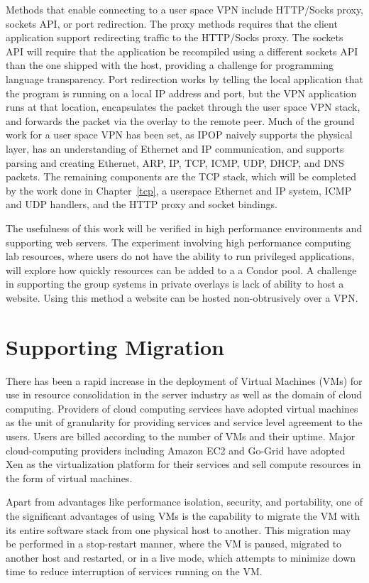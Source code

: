 Methods that enable connecting to a user space VPN include HTTP/Socks proxy,
sockets API, or port redirection.  The proxy methods requires that the client
application support redirecting traffic to the HTTP/Socks proxy.  The sockets
API will require that the application be recompiled using a different sockets
API than the one shipped with the host, providing a challenge for programming
language transparency.  Port redirection works by telling the local application
that the program is running on a local IP address and port, but the VPN
application runs at that location, encapsulates the packet through the user
space VPN stack, and forwards the packet via the overlay to the remote peer.
Much of the ground work for a user space VPN has been set, as IPOP naively
supports the physical layer, has an understanding of Ethernet and IP
communication, and supports parsing and creating Ethernet, ARP, IP, TCP, ICMP,
UDP, DHCP, and DNS packets.  The remaining components are the TCP stack, which
will be completed by the work done in Chapter~\ref{tcp}, a userspace Ethernet
and IP system, ICMP and UDP handlers, and the HTTP proxy and socket bindings.

The usefulness of this work will be verified in high performance environments
and supporting web servers.  The experiment involving high performance
computing lab resources, where users do not have the ability to run
privileged applications, will explore how quickly resources can be added to a
a Condor pool.  A challenge in supporting the group systems in private overlays
is lack of ability to host a website.  Using this method a website can be hosted
non-obtrusively over a VPN.

\section{Supporting Migration}
There has been a rapid increase in the deployment of Virtual Machines (VMs) for
use in resource consolidation in the server industry as well as the domain of
cloud computing.  Providers of cloud computing services have adopted virtual
machines as the unit of granularity for providing services and service level
agreement to the users.  Users are billed according to the number of VMs and
their uptime. Major cloud-computing providers including Amazon EC2 and Go-Grid
have adopted Xen as the virtualization platform for their services and sell
compute resources in the form of virtual machines.

Apart from advantages like performance isolation, security, and portability, one
of the significant advantages of using VMs is the capability to migrate the VM
with its entire software stack from one physical host to another.  This
migration may be performed in a stop-restart manner, where the VM is paused,
migrated to another host and restarted, or in a live mode, which attempts to
minimize down time to reduce interruption of services running on the VM.

